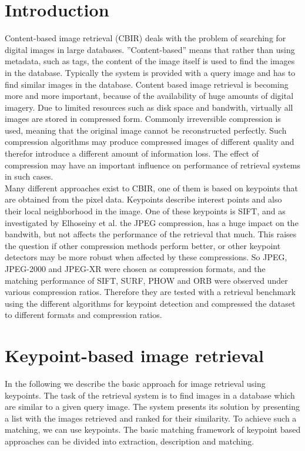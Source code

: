 \documentclass[10pt,a4paper]{article}
\begin{document}
\section{Introduction} 
Content-based image retrieval (CBIR) deals with the problem of searching for digital images in large databases. ''Content-based'' means that rather than using metadata, such as tags, the content of the image itself is used to find the images in the database. Typically the system is provided with a query image and has to find similar images in the database. Content based image retrieval is becoming more and more important, because of the availability of huge amounts of digital imagery. Due to limited resources such as disk space and bandwith, virtually all images are stored in compressed form. Commonly irreversible compression is used, meaning that the original image cannot be reconstructed perfectly. Such compression algorithms may produce compressed images of different quality and therefor introduce a different amount of information loss. The effect of compression may have an important influence on performance of retrieval systems in such cases.\\
Many different approaches exist to CBIR, one of them is based on keypoints that are obtained from the pixel data. Keypoints describe interest points and also their local neighborhood in the image. One of these keypoints is SIFT, and as investigated by Elhoseiny et al. \autocite{sift_jpg} the JPEG compression, has a huge impact on the bandwith, but not affects the performance of the retrieval that much. This raises the question if other compression methods perform better, or other keypoint detectors may be more robust when affected by these compressions. So JPEG, JPEG-2000 and JPEG-XR were chosen as compression formats, and the matching performance of SIFT\citep{lowe_sift}, SURF\cite{surf}, PHOW\citep{phow} and ORB\citep{orb} were observed under various compression ratios. Therefore they are tested with a retrieval benchmark using the different algorithms for keypoint detection and compressed the dataset to different formats and compression ratios.

\section{Keypoint-based image retrieval}
In the following we describe the basic approach for image retrieval using keypoints. The task of the retrieval system is to find images in a database which are similar to a given query image. The system presents its solution by presenting a list with the images retrieved and ranked for their similarity. To achieve such a matching, we can use keypoints. The basic matching framework of keypoint based approaches can be divided into extraction, description and matching.
\end{document}
